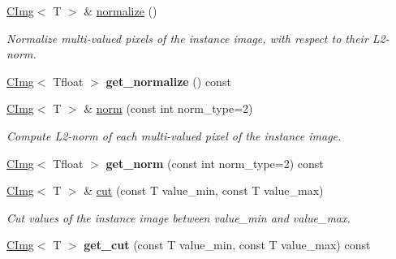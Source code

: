 \begin{DoxyCompactItemize}
\item 
\hyperlink{structcimg__library_1_1CImg}{CImg}$<$ T $>$ \& \hyperlink{structcimg__library_1_1CImg_a486a0949616bc142b22366f8acb2a6fe}{normalize} ()
\begin{DoxyCompactList}\small\item\em Normalize multi-\/valued pixels of the instance image, with respect to their L2-\/norm. \item\end{DoxyCompactList}\item 
\hypertarget{structcimg__library_1_1CImg_aa68c24b5cfab6b17d1a08ea33258bdd7}{
\hyperlink{structcimg__library_1_1CImg}{CImg}$<$ Tfloat $>$ {\bfseries get\_\-normalize} () const }
\label{structcimg__library_1_1CImg_aa68c24b5cfab6b17d1a08ea33258bdd7}

\item 
\hyperlink{structcimg__library_1_1CImg}{CImg}$<$ T $>$ \& \hyperlink{structcimg__library_1_1CImg_a0bb5a49d39c2aa768179457bd2488b5d}{norm} (const int norm\_\-type=2)
\begin{DoxyCompactList}\small\item\em Compute L2-\/norm of each multi-\/valued pixel of the instance image. \item\end{DoxyCompactList}\item 
\hypertarget{structcimg__library_1_1CImg_a943b3c828ec363b6b57d451723842f59}{
\hyperlink{structcimg__library_1_1CImg}{CImg}$<$ Tfloat $>$ {\bfseries get\_\-norm} (const int norm\_\-type=2) const }
\label{structcimg__library_1_1CImg_a943b3c828ec363b6b57d451723842f59}

\item 
\hyperlink{structcimg__library_1_1CImg}{CImg}$<$ T $>$ \& \hyperlink{structcimg__library_1_1CImg_a0934875836abb1b7e1dd10b0af258f1d}{cut} (const T value\_\-min, const T value\_\-max)
\begin{DoxyCompactList}\small\item\em Cut values of the instance image between {\ttfamily value\_\-min} and {\ttfamily value\_\-max}. \item\end{DoxyCompactList}\item 
\hypertarget{structcimg__library_1_1CImg_aacf75a39b6d1487321ca4c0282bc7735}{
\hyperlink{structcimg__library_1_1CImg}{CImg}$<$ T $>$ {\bfseries get\_\-cut} (const T value\_\-min, const T value\_\-max) const }
\label{structcimg__library_1_1CImg_aacf75a39b6d1487321ca4c0282bc7735}


\end{DoxyCompactItemize}
